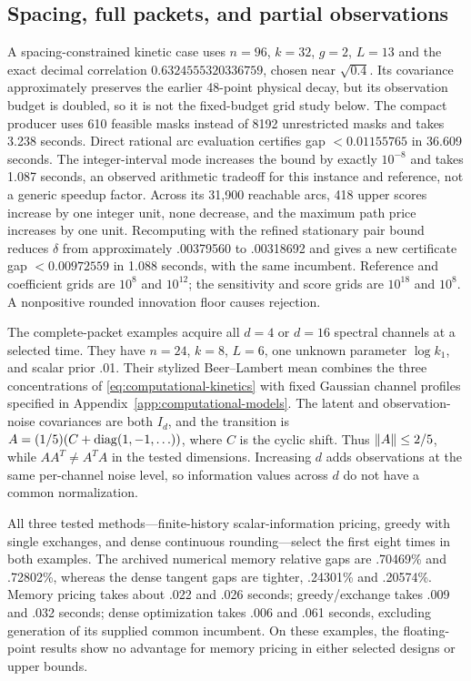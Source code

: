 \subsection{Spacing, full packets, and partial observations}
\label{subsec:packet-experiments}

A spacing-constrained kinetic case uses $n=96$, $k=32$, $g=2$, $L=13$ and
the exact decimal correlation $0.6324555320336759$, chosen near $\sqrt{0.4}$.
Its covariance approximately preserves the earlier 48-point physical decay,
but its observation budget is doubled, so it is not the fixed-budget grid study
below. The compact producer uses 610 feasible masks instead of 8192
unrestricted masks and takes 3.238 seconds. Direct rational arc evaluation
certifies gap $<0.01155765$ in 36.609 seconds. The integer-interval mode
increases the bound by exactly $10^{-8}$ and takes 1.087 seconds, an observed
arithmetic tradeoff for this instance and reference, not a generic speedup
factor. Across its 31,900 reachable arcs, 418 upper scores increase
by one integer unit, none decrease, and the maximum path price increases by
one unit. Recomputing with the refined stationary pair bound reduces
$\delta$ from approximately .00379560 to .00318692 and gives a new certificate
gap $<0.00972559$ in 1.088 seconds, with the same incumbent. Reference and
coefficient grids are $10^8$ and $10^{12}$; the sensitivity and score grids are
$10^{18}$ and $10^8$. A nonpositive rounded innovation floor causes rejection.

The complete-packet examples acquire all $d=4$ or $d=16$ spectral channels at
a selected time. They have $n=24$, $k=8$, $L=6$, one unknown parameter
$\log k_1$, and scalar prior .01. Their stylized Beer--Lambert mean combines
the three concentrations of \eqref{eq:computational-kinetics} with fixed
Gaussian channel profiles specified in Appendix~\ref{app:computational-models}.
The latent and observation-noise covariances are both $I_d$, and the transition
is $A=(1/5)(C+\operatorname{diag}(1,-1,\ldots))$, where $C$ is the cyclic shift.
Thus $\lVert A\rVert\le2/5$, while $AA^T\ne A^TA$ in the tested dimensions.
Increasing $d$ adds observations at the same per-channel noise level, so
information values across $d$ do not have a common normalization.

All three tested methods---finite-history scalar-information pricing,
greedy with single exchanges, and dense continuous rounding---select the
first eight times in both examples. The archived numerical memory relative
gaps are .70469\% and .72802\%, whereas the dense tangent gaps are tighter,
.24301\% and .20574\%. Memory pricing takes about .022 and .026 seconds;
greedy/exchange takes .009 and .032 seconds; dense optimization takes .006 and
.061 seconds, excluding generation of its supplied common incumbent.
On these examples, the floating-point results show no advantage for memory
pricing in either selected designs or upper bounds.

